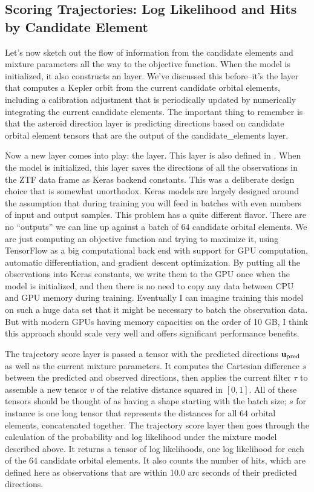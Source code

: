 \subsection{Scoring Trajectories: Log Likelihood and Hits by Candidate Element}
Let's now sketch out the flow of information from the candidate elements and mixture parameters all the way to the objective function.
When the model is initialized, it also constructs an  layer.
We've discussed this before--it's the layer that computes a Kepler orbit from the current candidate orbital elements,
including a calibration adjustment that is periodically updated by numerically integrating the current candidate elements.
The important thing to remember is that the asteroid direction layer is predicting directions based on candidate orbital element tensors
that are the output of the candidate\_elements layer.

Now a new layer comes into play: the  layer.
This layer is also defined in .
When the model is initialized, this layer saves the directions of all the observations in the ZTF data frame as Keras backend constants.
This was a deliberate design choice that is somewhat unorthodox.
Keras models are largely designed around the assumption that during training you will feed in batches with even numbers of input and output samples.
This problem has a quite different flavor.
There are no ``outputs'' we can line up against a batch of 64 candidate orbital elements.
We are just computing an objective function and trying to maximize it, using TensorFlow as a big computational back end with
support for GPU computation, automatic differentiation, and gradient descent optimization.
By putting all the observations into Keras constants, we write them to the GPU once when the model is initialized,
and then there is no need to copy any data between CPU and GPU memory during training.
Eventually I can imagine training this model on such a huge data set that it might be necessary to batch the observation data.
But with modern GPUs having memory capacities on the order of 10 GB, I think this approach should scale very well and offers significant performance benefits.

The trajectory score layer is passed a tensor with the predicted directions $\mathbf{u}_{\mathrm{pred}}$ as well as the current mixture parameters.
It computes the Cartesian difference $s$ between the predicted and observed directions, 
then applies the current filter $\tau$ to assemble a new tensor $v$ of the relative distance squared in $[0,1]$.
All of these tensors should be thought of as having a shape starting with the batch size;
$s$ for instance is one long tensor that represents the distances for all 64 orbital elements, concatenated together.
The trajectory score layer then goes through the calculation of the probability and log likelihood under the mixture model described above.
It returns a tensor of log likelihoods, one log likelihood for each of the 64 candidate orbital elements.
It also counts the number of hits, which are defined here as observations that are within 10.0 arc seconds of their predicted directions.

